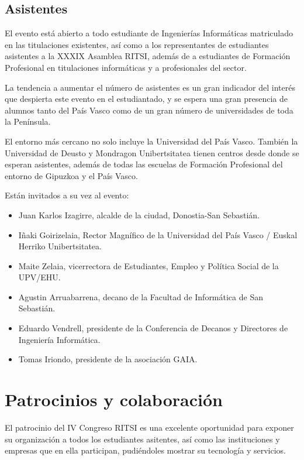 \documentclass[11pt]{ritsi/article}
\begin{document}
\subsection{Asistentes}

El evento está abierto a todo estudiante de Ingenierías Informáticas matriculado en las titulaciones existentes, así como a los representantes de estudiantes asistentes a la XXXIX Asamblea RITSI, además de a estudiantes de Formación Profesional en titulaciones informáticas y a profesionales del sector.

La tendencia a aumentar el número de asistentes es un gran indicador del interés que despierta este evento en el estudiantado, y se espera una gran presencia de alumnos tanto del País Vasco como de un gran número de universidades de toda la Península.

El entorno más cercano no solo incluye la Universidad del País Vasco. También la Universidad de Deusto y Mondragon Unibertsitatea tienen centros desde donde se esperan asistentes, además de todas las escuelas de Formación Profesional del entorno de Gipuzkoa y el País Vasco.

\noindent Están invitados a su vez al evento:

\begin{itemize}
    \item Juan Karlos Izagirre, alcalde de la ciudad, Donostia-San Sebastián.
    \item Iñaki Goirizelaia, Rector Magnífico de la Universidad del País Vasco / Euskal Herriko Unibertsitatea.
    \item Maite Zelaia, vicerrectora de Estudiantes, Empleo y Política Social de la UPV/EHU.
    \item Agustin Arruabarrena, decano de la Facultad de Informática de San Sebastián.
    \item Eduardo Vendrell, presidente de la Conferencia de Decanos y Directores de Ingeniería Informática.
    \item Tomas Iriondo, presidente de la asociación GAIA.
\end{itemize}

\section{Patrocinios y colaboración}

El patrocinio del IV Congreso RITSI es una excelente oportunidad para exponer su organización a todos los estudiantes asitentes, así como las instituciones y empresas que en ella participan, pudiéndoles mostrar su tecnología y servicios.
\end{document}
